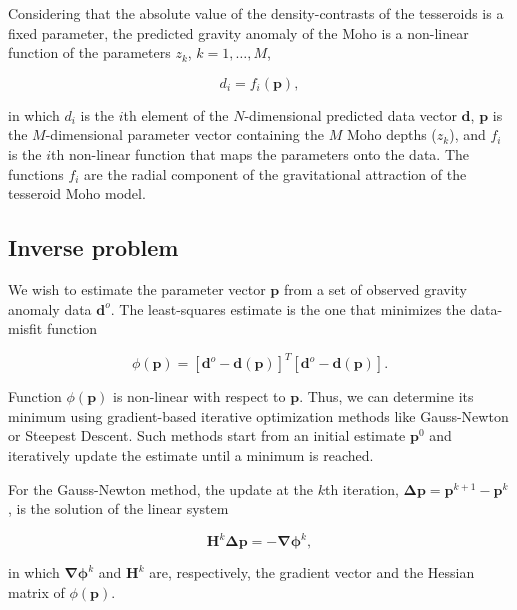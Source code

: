 \documentclass[extra]{gji}
\begin{document}
Considering that the absolute value of the density-contrasts
of the tesseroids is a fixed parameter,
the predicted gravity anomaly of the Moho is a non-linear function of the
parameters $z_k$, $k=1, \ldots, M$,

\begin{equation}
    d_i = f_i(\mathbf{p}),
    \label{eq:forward}
\end{equation}

\noindent in which $d_i$ is the $i$th element of the $N$-dimensional predicted
data vector $\mathbf{d}$, $\mathbf{p}$ is the $M$-dimensional parameter vector
containing the $M$ Moho depths ($z_k$),
and $f_i$ is the $i$th non-linear function that maps the parameters onto the
data.
The functions $f_i$ are the radial component of the gravitational attraction
of the tesseroid Moho model.



\subsection{Inverse problem}

We wish to estimate the parameter vector $\mathbf{p}$ from a set of observed
gravity anomaly data $\mathbf{d}^o$.
The least-squares estimate is the one that minimizes the data-misfit function

\begin{equation}
    \phi(\mathbf{p}) =
    [\mathbf{d}^o - \mathbf{d}(\mathbf{p})]^T[\mathbf{d}^o - \mathbf{d}(\mathbf{p})].
    \label{eq:data-misfit}
\end{equation}

Function $\phi(\mathbf{p})$ is non-linear with respect to $\mathbf{p}$.
Thus, we can determine its minimum using gradient-based
iterative optimization
methods like Gauss-Newton or Steepest Descent.
Such methods start from an initial estimate $\mathbf{p}^0$ and iteratively
update the estimate until a minimum is reached.

For the Gauss-Newton method,
the update at the $k$th iteration,
$\mathbf{\Delta p} = \mathbf{p}^{k+1} - \mathbf{p}^k$,
is the solution of the linear system

\begin{equation}
    \mathbf{H}^k\mathbf{\Delta p} = -\mathbf{\nabla\phi}^k,
    \label{eq:gaussnewton}
\end{equation}

\noindent in which
$\mathbf{\nabla\phi}^k$ and $\mathbf{H}^k$ are, respectively,
the gradient vector and the Hessian matrix of $\phi(\mathbf{p})$.
\end{document}
